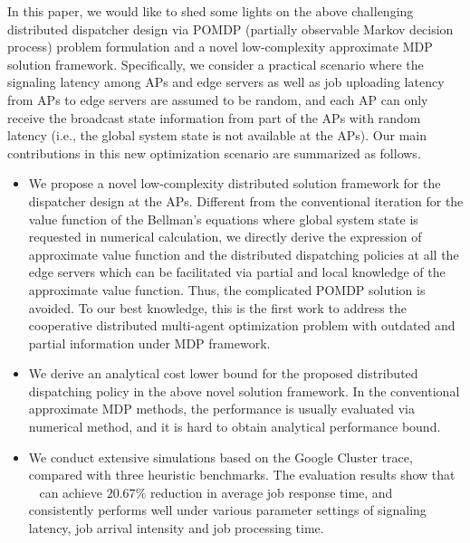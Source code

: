 In this paper, we would like to shed some lights on the above challenging distributed dispatcher design via POMDP (partially observable Markov decision process) problem formulation and a novel low-complexity approximate MDP solution framework.
Specifically, we consider a practical scenario where the signaling latency among APs and edge servers as well as job uploading latency from APs to edge servers are assumed to be random, and each AP can only {receive the broadcast state information from part of the APs} with random latency (i.e., the global system state is not available at the APs).
Our main contributions in this new optimization scenario are summarized as follows.
\begin{itemize}
    \item We propose a novel low-complexity distributed solution framework for the dispatcher design at the APs.
    Different from the conventional iteration for the value function of the Bellman's equations where global system state is requested in numerical calculation,
    we directly derive the expression of approximate value function and the distributed dispatching policies at all the edge servers which can be facilitated via partial and local knowledge of the approximate value function.
    Thus, the complicated POMDP solution is avoided.
    To our best knowledge, this is the first work to address the cooperative distributed multi-agent optimization problem {with outdated and partial information} under MDP framework.
    \item We derive an analytical cost lower bound for the proposed distributed dispatching policy in the above novel solution framework. In the conventional approximate MDP methods, the performance is usually evaluated via numerical method, and it is hard to obtain analytical performance bound. 
    \item We conduct extensive simulations based on the Google Cluster trace, compared with three heuristic benchmarks. The evaluation results show that \algname~ can achieve $20.67\%$ reduction in average job response time, and \algname~ consistently performs well under various parameter settings of signaling latency, job arrival intensity and job processing time. 
\end{itemize}

